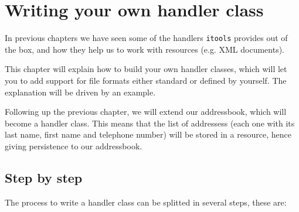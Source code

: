\chapter{Writing your own handler class}

In previous chapters we have seen some of the handlers {\tt itools} provides
out of the box, and how they help us to work with resources (e.g. XML
documents).


This chapter will explain how to build your own handler classes, which will
let you to add support for file formats either standard or defined by yourself.
The explanation will be driven by an example.

Following up the previous chapter, we will extend our addressbook, which
will become a handler class. This means that the list of addressess (each
one with its last name, first name and telephone number) will be stored in
a resource, hence giving persistence to our addressbook.

\section{Step by step}

The process to write a handler class can be splitted in several steps, these
are:

